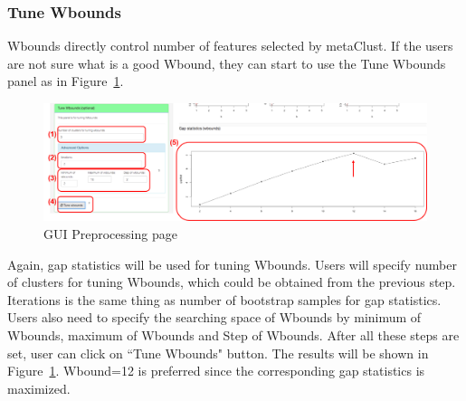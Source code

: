 \documentclass{article}
\begin{document}
\subsubsection{Tune Wbounds}
Wbounds directly control number of features selected by metaClust.
If the users are not sure what is a good Wbound,
they can start to use the Tune Wbounds panel as in Figure~\ref{fig:metaClusttuneW}.
\begin{figure}[H]
\begin{center}
\includegraphics[scale=0.35]{./figure/metaClust/tuneW}
\caption{GUI Preprocessing page}
\label{fig:metaClusttuneW}
\end{center}
\end{figure}
Again,
gap statistics will be used for tuning Wbounds.
Users will specify number of clusters for tuning Wbounds, which could be obtained from the previous step.
Iterations is the same thing as number of bootstrap samples for gap statistics.
Users also need to specify the searching space of Wbounds by minimum of Wbounds, maximum of Wbounds and Step of Wbounds.
After all these steps are set,
user can click on ``Tune Wbounds" button.
The results will be shown in Figure~\ref{fig:metaClusttuneW}.
Wbound=12 is preferred since the corresponding gap statistics is maximized.
\end{document}
